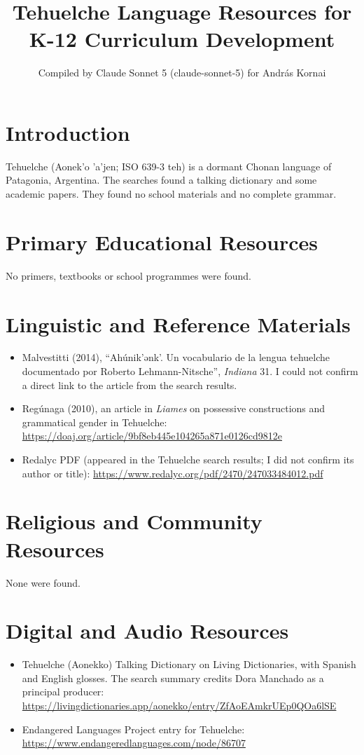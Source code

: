 \documentclass[12pt]{article}
\title{Tehuelche Language Resources for K-12 Curriculum Development}
\author{Compiled by Claude Sonnet 5 (claude-sonnet-5) for Andr\'as Kornai}
\date{}
\begin{document}
\maketitle

\section{Introduction}
Tehuelche (Aonek'o 'a'jen; ISO 639-3 teh) is a dormant Chonan language of Patagonia, Argentina. The searches found a talking dictionary and some academic papers. They found no school materials and no complete grammar.

\section{Primary Educational Resources}
No primers, textbooks or school programmes were found.

\section{Linguistic and Reference Materials}
\begin{itemize}
\item Malvestitti (2014), ``Ah\'unik'ənk'. Un vocabulario de la lengua tehuelche documentado por Roberto Lehmann-Nitsche'', \emph{Indiana} 31. I could not confirm a direct link to the article from the search results.
\item Reg\'unaga (2010), an article in \emph{Liames} on possessive constructions and grammatical gender in Tehuelche: \url{https://doaj.org/article/9bf8eb445e104265a871e0126cd9812e}
\item Redalyc PDF (appeared in the Tehuelche search results; I did not confirm its author or title): \url{https://www.redalyc.org/pdf/2470/247033484012.pdf}
\end{itemize}

\section{Religious and Community Resources}
None were found.

\section{Digital and Audio Resources}
\begin{itemize}
\item Tehuelche (Aonekko) Talking Dictionary on Living Dictionaries, with Spanish and English glosses. The search summary credits Dora Manchado as a principal producer: \url{https://livingdictionaries.app/aonekko/entry/ZfAoEAmkrUEp0QOa6lSE}
\item Endangered Languages Project entry for Tehuelche: \url{https://www.endangeredlanguages.com/node/86707}
\end{itemize}
\end{document}
